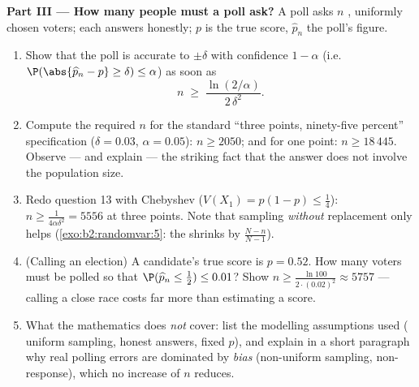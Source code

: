 \begin{problem}
\medskip
\noindent\textbf{Part III --- How many people must a poll
ask?} A poll asks $n$ , uniformly chosen voters;
each answers honestly; $p$ is the true score, $\widehat p_n$
the poll's figure.
\begin{enumerate}[resume]
  \item Show that the poll is accurate to $\pm\delta$ with
        confidence $1 - \alpha$ (i.e.\
        $\P(\abs{\widehat p_n - p} \geq \delta) \leq \alpha$)
        as soon as
        \[
        n \;\geq\; \frac{\ln(2/\alpha)}{2\,\delta^2} .
        \]
  \item Compute the required $n$ for the standard ``three
        points, ninety-five percent'' specification ($\delta
        = 0.03$, $\alpha = 0.05$): $n \geq 2050$; and for one
        point: $n \geq 18\,445$. Observe --- and explain ---
        the striking fact that the answer does not involve
        the population size.
  \item Redo question 13 with Chebyshev ($V(X_1) = p(1-p)
        \leq \frac14$): $n \geq \frac1{4\alpha\delta^2} =
        5556$ at three points. Note that sampling
        \emph{without} replacement only helps
        (\cref{exo:b2:randomvar:5}: the  shrinks by
        $\frac{N-n}{N-1}$).
  \item (Calling an election) A candidate's true score is $p
        = 0.52$. How many voters must be polled so that
        $\P(\widehat p_n \leq \tfrac12) \leq 0.01$? Show $n
        \geq \frac{\ln 100}{2\cdot(0.02)^2} \approx 5757$ ---
        calling a close race costs far more than estimating a
        score.
  \item What the mathematics does \emph{not} cover: list the
        modelling assumptions used ( uniform
        sampling, honest answers, fixed $p$), and explain in
        a short paragraph why real polling errors are
        dominated by \emph{bias} (non-uniform sampling,
        non-response), which no increase of $n$ reduces.
\end{enumerate}


\end{problem}
